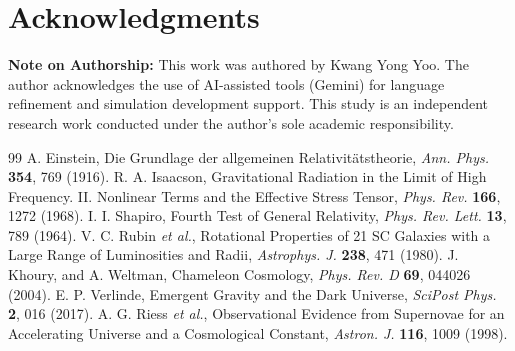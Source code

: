 \documentclass[reprint,amsmath,amssymb,aps,prd]{revtex4-2}
\begin{document}
\section*{Acknowledgments}
\textbf{Note on Authorship:} This work was authored by Kwang Yong Yoo. The author acknowledges the use of AI-assisted tools (Gemini) for language refinement and simulation development support. This study is an independent research work conducted under the author's sole academic responsibility.

\begin{thebibliography}{99}
 A. Einstein, Die Grundlage der allgemeinen Relativit\"{a}tstheorie, \textit{Ann. Phys.} \textbf{354}, 769 (1916).
 R. A. Isaacson, Gravitational Radiation in the Limit of High Frequency. II. Nonlinear Terms and the Effective Stress Tensor, \textit{Phys. Rev.} \textbf{166}, 1272 (1968).
 I. I. Shapiro, Fourth Test of General Relativity, \textit{Phys. Rev. Lett.} \textbf{13}, 789 (1964).
 V. C. Rubin \textit{et al.}, Rotational Properties of 21 SC Galaxies with a Large Range of Luminosities and Radii, \textit{Astrophys. J.} \textbf{238}, 471 (1980).
 J. Khoury, and A. Weltman, Chameleon Cosmology, \textit{Phys. Rev. D} \textbf{69}, 044026 (2004).
 E. P. Verlinde, Emergent Gravity and the Dark Universe, \textit{SciPost Phys.} \textbf{2}, 016 (2017).
 A. G. Riess \textit{et al.}, Observational Evidence from Supernovae for an Accelerating Universe and a Cosmological Constant, \textit{Astron. J.} \textbf{116}, 1009 (1998).
\end{thebibliography}
\end{document}

